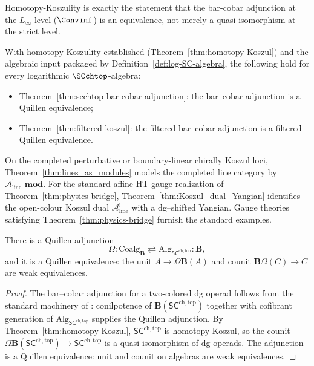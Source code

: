 \begin{remark}
\label{rem:hkoszul-two-level}
Homotopy-Koszulity is exactly the statement that the bar-cobar
adjunction at the $L_\infty$ level ($\Convinf$) is an equivalence,
not merely a quasi-isomorphism at the strict level.
\end{remark}

\begin{remark}
\label{rmk:hKoszul-dependence}
With homotopy-Koszulity established
(Theorem~\ref{thm:homotopy-Koszul}) and the algebraic input
packaged by Definition~\ref{def:log-SC-algebra}, the following hold
for every logarithmic $\SCchtop$-algebra:
\begin{itemize}
\item Theorem~\ref{thm:scchtop-bar-cobar-adjunction}:
 the bar--cobar adjunction is a Quillen equivalence;
\item Theorem~\ref{thm:filtered-koszul}:
 the filtered bar--cobar adjunction is a filtered Quillen equivalence.
\end{itemize}
On the completed perturbative or boundary-linear chirally Koszul loci,
Theorem~\ref{thm:lines_as_modules} models the completed line category
by $\mathcal A^!_{\mathrm{line}}\text{-}\mathbf{mod}$. For the standard
affine HT gauge realization of Theorem~\ref{thm:physics-bridge},
Theorem~\ref{thm:Koszul_dual_Yangian} identifies the open-colour
Koszul dual $\mathcal A^!_{\mathrm{line}}$ with a dg--shifted Yangian.
Gauge theories satisfying Theorem~\ref{thm:physics-bridge} furnish
the standard examples.
\end{remark}

\begin{theorem}
\label{thm:scchtop-bar-cobar-adjunction}
There is a Quillen adjunction
\[
\Omega: \mathrm{Coalg}_{\mathbf B}\rightleftarrows \mathrm{Alg}_{\mathsf{SC}^{\mathrm{ch,top}}}:\mathbf B,
\]
and it is a Quillen equivalence: the unit
$A\to\Omega\mathbf B(A)$ and counit $\mathbf B\Omega(C)\to C$ are weak equivalences.
\end{theorem}

\begin{proof}
The bar--cobar adjunction for a two-colored dg operad follows from the
standard machinery of \cite{GK94,Val07}: conilpotence of
$\mathbf B(\mathsf{SC}^{\mathrm{ch,top}})$ together with cofibrant
generation of $\mathrm{Alg}_{\mathsf{SC}^{\mathrm{ch,top}}}$ supplies
the Quillen adjunction. By Theorem~\ref{thm:homotopy-Koszul},
$\mathsf{SC}^{\mathrm{ch,top}}$ is homotopy-Koszul, so the counit
$\Omega\mathbf B(\mathsf{SC}^{\mathrm{ch,top}})\to
\mathsf{SC}^{\mathrm{ch,top}}$ is a quasi-isomorphism of dg operads.
The adjunction is a Quillen equivalence: unit and counit on algebras
are weak equivalences.
\end{proof}

